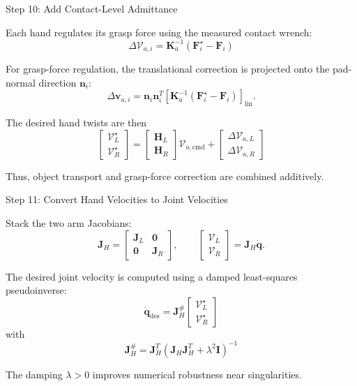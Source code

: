 \documentclass[aspectratio=169]{beamer}
\newcommand{\vect}[1]{\bm{#1}}
\begin{document}
\begin{frame}{Step 10: Add Contact-Level Admittance}

Each hand regulates its grasp force using the measured contact wrench:
\[
\boxed{
\Delta\vect{\mathcal{V}}_{a,i}
=\vect{K}_{a}^{-1}
\left(\vect{F}^{\star}_{i}-\vect{F}_{i}\right)
}
\]

For grasp-force regulation, the translational correction is projected onto
the pad-normal direction $\vect{n}_i$:
\[
\Delta\vect{v}_{a,i}
=\vect{n}_i\vect{n}_i^T
\left[\vect{K}_{a}^{-1}
(\vect{F}^{\star}_{i}-\vect{F}_{i})\right]_{\mathrm{lin}}.
\]

The desired hand twists are then
\[
\boxed{
\begin{bmatrix}
\vect{\mathcal{V}}_{L}^{\star}\\
\vect{\mathcal{V}}_{R}^{\star}
\end{bmatrix}
=
\begin{bmatrix}
\vect{H}_{L}\\
\vect{H}_{R}
\end{bmatrix}
\vect{\mathcal{V}}_{o,\mathrm{cmd}}
+
\begin{bmatrix}
\Delta\vect{\mathcal{V}}_{a,L}\\
\Delta\vect{\mathcal{V}}_{a,R}
\end{bmatrix}
}
\]

Thus, object transport and grasp-force correction are combined additively.

\end{frame}

\begin{frame}{Step 11: Convert Hand Velocities to Joint Velocities}

Stack the two arm Jacobians:
\[
\vect{J}_{H}
=
\begin{bmatrix}
\vect{J}_{L}&\vect{0}\\
\vect{0}&\vect{J}_{R}
\end{bmatrix},
\qquad
\begin{bmatrix}
\vect{\mathcal{V}}_{L}\\
\vect{\mathcal{V}}_{R}
\end{bmatrix}
=\vect{J}_{H}\dot{\vect{q}}.
\]

The desired joint velocity is computed using a damped least-squares
pseudoinverse:
\[
\boxed{
\dot{\vect{q}}_{\mathrm{des}}
=\vect{J}_{H}^{\#}
\begin{bmatrix}
\vect{\mathcal{V}}_{L}^{\star}\\
\vect{\mathcal{V}}_{R}^{\star}
\end{bmatrix}
}
\]
with
\[
\boxed{
\vect{J}_{H}^{\#}
=\vect{J}_{H}^{T}
\left(\vect{J}_{H}\vect{J}_{H}^{T}
+\lambda^2\vect{I}\right)^{-1}
}
\]

The damping $\lambda>0$ improves numerical robustness near singularities.

\end{frame}
\end{document}
